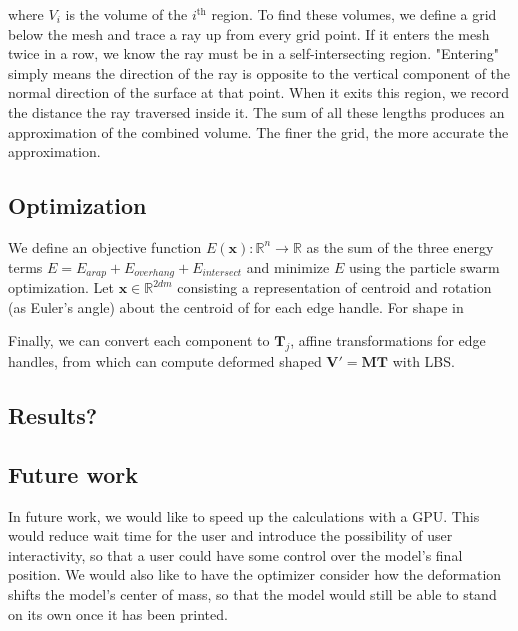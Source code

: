 \documentclass[10pt]{article}
\newcommand{\R}{\mathbb{R}}
\newcommand{\bV}{\mathbf{V}}
\newcommand{\bM}{\mathbf{M}}
\newcommand{\bT}{\mathbf{T}}
\newcommand{\bx}{\mathbf{x}}
\begin{document}
\begin{multicols}{2}
where $V_i$ is the volume of the $i^{\text{th}}$ region. To find these volumes, we define a grid below the mesh and trace a ray up from every grid point. If it enters the mesh twice in a row, we know the ray must be in a self-intersecting region. "Entering" simply means the direction of the ray is opposite to the vertical component of the normal direction of the surface at that point. When it exits this region, we record the distance the ray traversed inside it. The sum of all these lengths produces an approximation of the combined volume. The finer the grid, the more accurate the approximation.


\subsection*{Optimization}

We define an objective function $E(\bx): \R^n \rightarrow \R$ as the sum of the three energy terms $E = E_{arap} + E_{overhang} + E_{intersect}$
and minimize $E$ using the particle swarm optimization. Let $\bx \in \R^{2dm}$ consisting a representation of centroid and rotation (as Euler's angle) about the centroid of for each edge handle. For shape in 

Finally, we can convert each component to $\bT_j$, affine transformations for edge handles, from which can compute deformed shaped $\bV' = \bM \bT$ with LBS.

\subsection*{Results?}

\subsection*{Future work}
In future work, we would like to speed up the calculations with a GPU. This would reduce wait time for the user and introduce the possibility of user interactivity, so that a user could have some control over the model's final position. We would also like to have the optimizer consider how the deformation shifts the model's center of mass, so that the model would still be able to stand on its own once it has been printed.


\end{multicols} 
\end{document}
